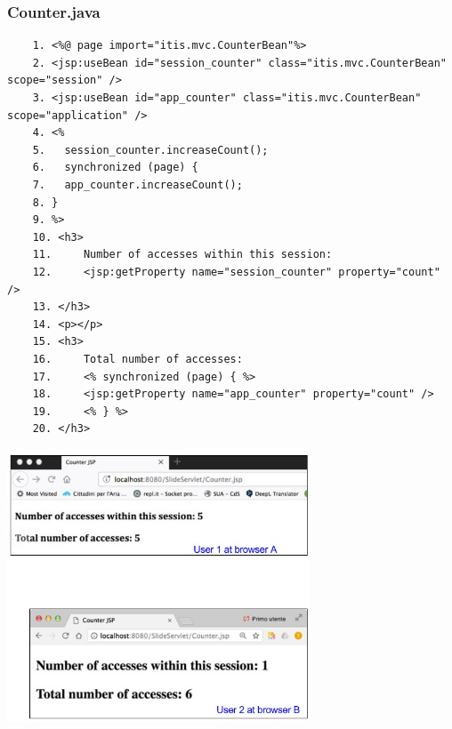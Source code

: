 \begin{itemize}
\subsubsection{Counter.java}
\begin{verbatim}
    1. <%@ page import="itis.mvc.CounterBean"%>
    2. <jsp:useBean id="session_counter" class="itis.mvc.CounterBean" scope="session" />
    3. <jsp:useBean id="app_counter" class="itis.mvc.CounterBean" scope="application" />
    4. <%
    5.   session_counter.increaseCount();
    6.   synchronized (page) {
    7.   app_counter.increaseCount();
    8. }
    9. %>
    10. <h3>
    11.     Number of accesses within this session:
    12.     <jsp:getProperty name="session_counter" property="count" />
    13. </h3>
    14. <p></p>
    15. <h3>
    16.     Total number of accesses:
    17.     <% synchronized (page) { %>
    18.     <jsp:getProperty name="app_counter" property="count" />
    19.     <% } %>
    20. </h3>
\end{verbatim}
\begin{center}
    \includegraphics[width=0.675\textwidth]{img/appWeb20.jpg}
\end{center}


\end{itemize}
